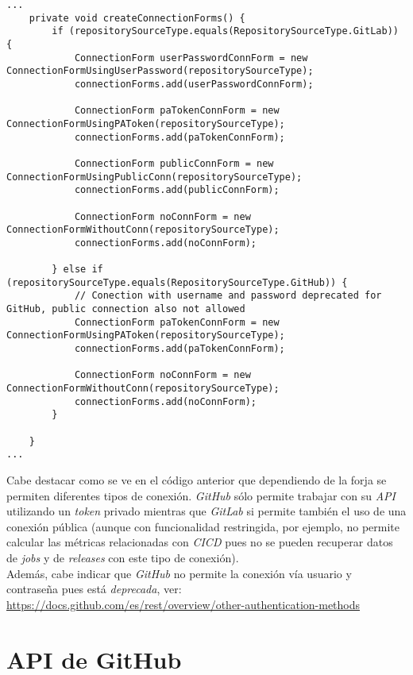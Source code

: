 \begin{minipage}{\linewidth}
{\tiny
\begin{verbatim}
...
	private void createConnectionForms() {
		if (repositorySourceType.equals(RepositorySourceType.GitLab)) {
			ConnectionForm userPasswordConnForm = new ConnectionFormUsingUserPassword(repositorySourceType);
			connectionForms.add(userPasswordConnForm);

			ConnectionForm paTokenConnForm = new ConnectionFormUsingPAToken(repositorySourceType);
			connectionForms.add(paTokenConnForm);

			ConnectionForm publicConnForm = new ConnectionFormUsingPublicConn(repositorySourceType);
			connectionForms.add(publicConnForm);

			ConnectionForm noConnForm = new ConnectionFormWithoutConn(repositorySourceType);
			connectionForms.add(noConnForm);
			
		} else if (repositorySourceType.equals(RepositorySourceType.GitHub)) {
			// Conection with username and password deprecated for GitHub, public connection also not allowed
			ConnectionForm paTokenConnForm = new ConnectionFormUsingPAToken(repositorySourceType);
			connectionForms.add(paTokenConnForm);

			ConnectionForm noConnForm = new ConnectionFormWithoutConn(repositorySourceType);
			connectionForms.add(noConnForm);
		}
	
	}
...
\end{verbatim}
}
\end{minipage}

Cabe destacar como se ve en el código anterior que dependiendo de la forja se permiten diferentes tipos de conexión. \textit{GitHub} sólo permite trabajar con su \textit{API} utilizando un \textit{token} privado mientras que \textit{GitLab} si permite también el uso de una conexión pública (aunque con funcionalidad restringida, por ejemplo, no permite calcular las métricas relacionadas con \textit{CICD} pues no se pueden recuperar datos de \textit{jobs} y de \textit{releases} con este tipo de conexión).\\
Además, cabe indicar que \textit{GitHub} no permite la conexión vía usuario y contraseña pues está \textit{deprecada}, ver:\\
\url{https://docs.github.com/es/rest/overview/other-authentication-methods}

\newpage
\section{API de GitHub} 

